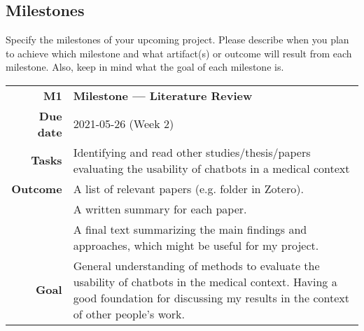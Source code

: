 \subsection{Milestones}
\label{subsec:milestone}
Specify the milestones of your upcoming project. Please describe when you plan to achieve which milestone and what artifact(s) or outcome will result from each milestone. Also, keep in mind what the goal of each milestone is.


\begin{table}[h]
\small
\colorbox{usethiscolorhere}{
\centering
\begin{tabularx}{\textwidth}{@{} r Y @{}}
	\textbf{M1}
	& \textbf{Milestone --- Literature Review}\vspace{2mm}\\
	\textbf{Due date} & 2021-05-26 (Week $2$)\vspace{2mm}\\
     \textbf{Tasks} & Identifying and read other studies/thesis/papers evaluating the usability of chatbots in a medical context\vspace{2mm}\\
    \textbf{Outcome} & A list of relevant papers (e.g. folder in Zotero).\\
    & A written summary for each paper.\\
    & A final text summarizing the main findings and approaches, which might be useful for my project. \vspace{2mm}\\
    \textbf{Goal} & General understanding of methods to evaluate the usability of chatbots in the medical context. Having a good foundation for discussing my results in the context of other people's work.\vspace{2mm}\\
    
\end{tabularx}
}
\end{table}

